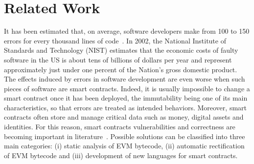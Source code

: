 \section{Related Work}\label{sec:related_work}

It has been estimated that, on average, software developers make from 100 to 150 errors
for every thousand lines of code~\cite{software_engineering}.
In 2002, the National Institute of Standards and Technology (NIST) estimates that the economic
costs of faulty software in the US is about tens of billions of dollars per year and represent
approximately just under one percent of the Nation's gross domestic product.
The effects induced by errors in software development are even worse when such pieces of software
are smart contracts. Indeed, it is usually impossible to change a smart contract once
it has been deployed, the immutability being one of its main characteristics, so that
errors are treated as intended behaviors. Moreover, smart contracts often store and
manage critical data such as money, digital assets and identities. For this reason, smart contracts
vulnerabilities and correctness are becoming important in literature~\cite{smart_contracts_verification}. Possible solutions can be
classified into three main categories: (i) static analysis of EVM bytecode,
(ii) automatic rectification of EVM bytecode and (iii) development of new languages
for smart contracts.

